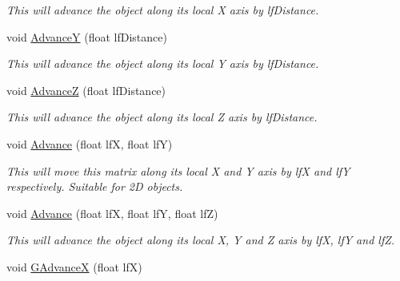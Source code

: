 \begin{DoxyCompactItemize}
\begin{DoxyCompactList}\small\item\em This will advance the object along its local X axis by lfDistance. \end{DoxyCompactList}\item 
\hypertarget{classc_matrix4_ae28d0f2cfe996ec5422cdaec98f30c9a}{
void \hyperlink{classc_matrix4_ae28d0f2cfe996ec5422cdaec98f30c9a}{AdvanceY} (float lfDistance)}
\label{classc_matrix4_ae28d0f2cfe996ec5422cdaec98f30c9a}

\begin{DoxyCompactList}\small\item\em This will advance the object along its local Y axis by lfDistance. \end{DoxyCompactList}\item 
\hypertarget{classc_matrix4_a31d0d26e3b91628365871ad10dc33f8e}{
void \hyperlink{classc_matrix4_a31d0d26e3b91628365871ad10dc33f8e}{AdvanceZ} (float lfDistance)}
\label{classc_matrix4_a31d0d26e3b91628365871ad10dc33f8e}

\begin{DoxyCompactList}\small\item\em This will advance the object along its local Z axis by lfDistance. \end{DoxyCompactList}\item 
\hypertarget{classc_matrix4_ab956ec27a465b889126632475fd7d703}{
void \hyperlink{classc_matrix4_ab956ec27a465b889126632475fd7d703}{Advance} (float lfX, float lfY)}
\label{classc_matrix4_ab956ec27a465b889126632475fd7d703}

\begin{DoxyCompactList}\small\item\em This will move this matrix along its local X and Y axis by lfX and lfY respectively. Suitable for 2D objects. \end{DoxyCompactList}\item 
\hypertarget{classc_matrix4_a00d27c2daab0e05c403c8fb86445fb81}{
void \hyperlink{classc_matrix4_a00d27c2daab0e05c403c8fb86445fb81}{Advance} (float lfX, float lfY, float lfZ)}
\label{classc_matrix4_a00d27c2daab0e05c403c8fb86445fb81}

\begin{DoxyCompactList}\small\item\em This will advance the object along its local X, Y and Z axis by lfX, lfY and lfZ. \end{DoxyCompactList}\item 
\hypertarget{classc_matrix4_a6796b615c465903d48fe0c8094b1f7c1}{
void \hyperlink{classc_matrix4_a6796b615c465903d48fe0c8094b1f7c1}{GAdvanceX} (float lfX)}
\label{classc_matrix4_a6796b615c465903d48fe0c8094b1f7c1}


\end{DoxyCompactItemize}
